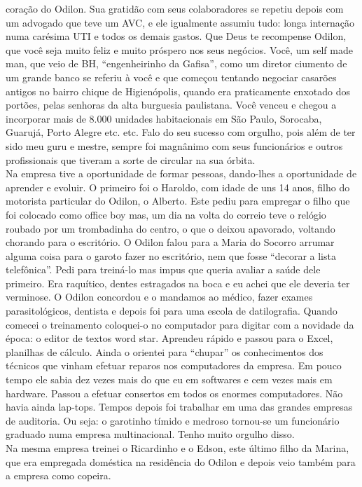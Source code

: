 \documentclass[12pt,brazil,]{book}
\begin{document}
coração do Odilon. Sua gratidão com seus colaboradores se repetiu depois
com um advogado que teve um AVC, e ele igualmente assumiu tudo: longa
internação numa carésima UTI e todos os demais gastos. Que Deus te
recompense Odilon, que você seja muito feliz e muito próspero nos seus
negócios. Você, um self made man, que veio de BH, ``engenheirinho da
Gafisa'', como um diretor ciumento de um grande banco se referiu à você
e que começou tentando negociar casarões antigos no bairro chique de
Higienópolis, quando era praticamente enxotado dos portões, pelas
senhoras da alta burguesia paulistana. Você venceu e chegou a incorporar
mais de 8.000 unidades habitacionais em São Paulo, Sorocaba, Guarujá,
Porto Alegre etc. etc. Falo do seu sucesso com orgulho, pois além de ter
sido meu guru e mestre, sempre foi magnânimo com seus funcionários e
outros profissionais que tiveram a sorte de circular na sua órbita.\\
Na empresa tive a oportunidade de formar pessoas, dando-lhes a
oportunidade de aprender e evoluir. O primeiro foi o Haroldo, com idade
de uns 14 anos, filho do motorista particular do Odilon, o Alberto. Este
pediu para empregar o filho que foi colocado como office boy mas, um dia
na volta do correio teve o relógio roubado por um trombadinha do centro,
o que o deixou apavorado, voltando chorando para o escritório. O Odilon
falou para a Maria do Socorro arrumar alguma coisa para o garoto fazer
no escritório, nem que fosse ``decorar a lista telefônica''. Pedi para
treiná-lo mas impus que queria avaliar a saúde dele primeiro. Era
raquítico, dentes estragados na boca e eu achei que ele deveria ter
verminose. O Odilon concordou e o mandamos ao médico, fazer exames
parasitológicos, dentista e depois foi para uma escola de datilografia.
Quando comecei o treinamento coloquei-o no computador para digitar com a
novidade da época: o editor de textos word star. Aprendeu rápido e
passou para o Excel, planilhas de cálculo. Ainda o orientei para
``chupar'' os conhecimentos dos técnicos que vinham efetuar reparos nos
computadores da empresa. Em pouco tempo ele sabia dez vezes mais do que
eu em softwares e cem vezes mais em hardware. Passou a efetuar consertos
em todos os enormes computadores. Não havia ainda lap-tops. Tempos
depois foi trabalhar em uma das grandes empresas de auditoria. Ou seja:
o garotinho tímido e medroso tornou-se um funcionário graduado numa
empresa multinacional. Tenho muito orgulho disso.\\
Na mesma empresa treinei o Ricardinho e o Edson, este último filho da
Marina, que era empregada doméstica na residência do Odilon e depois
veio também para a empresa como copeira.
\end{document}
